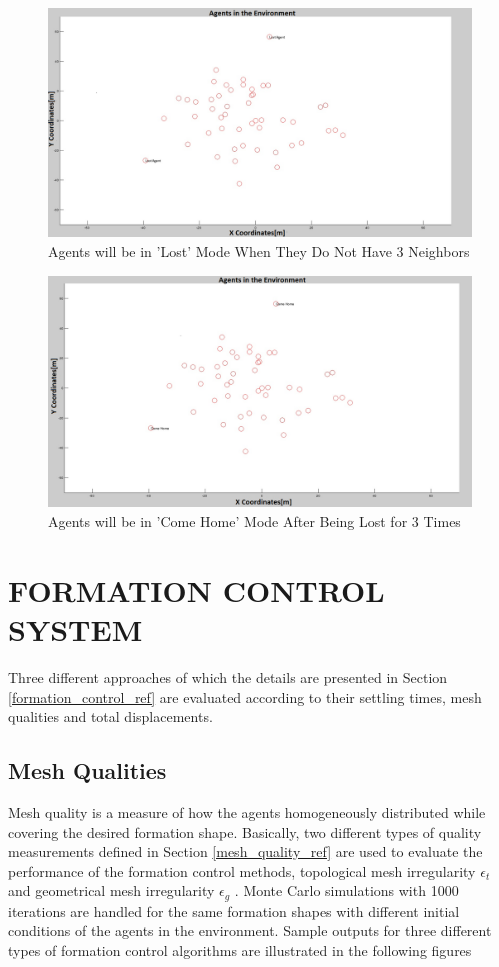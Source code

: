 \begin{figure}[H]
\caption{Agents will be in 'Lost' Mode When They Do Not Have 3 Neighbors} \label{lost_ref}
\centering
\centerline{\includegraphics[scale = 0.25]{Lost-2-2}}
\end{figure} 

\begin{figure}[H]
\captionsetup{format=hang,justification=centerfirst}
\caption{Agents will be in 'Come Home' Mode After Being Lost for 3 Times} \label{come_home_ref}
\centerline{\includegraphics[scale = 0.25]{Lost-2-3}}
\end{figure} 		
		
\section{FORMATION CONTROL SYSTEM}
Three different approaches of which the details are presented in Section \ref{formation_control_ref} are evaluated according to their settling times, mesh qualities and total displacements. 

\subsection{Mesh Qualities} 
Mesh quality is a measure of how the agents homogeneously distributed while covering the desired formation shape. Basically, two different types of quality measurements defined in Section \ref{mesh_quality_ref} are used to evaluate the performance of the formation control methods, topological mesh irregularity $\epsilon_t$ and geometrical mesh irregularity $\epsilon_g$ . Monte Carlo simulations with 1000 iterations are handled for the same formation shapes with different initial conditions of the agents in the environment. Sample outputs for three different types of formation control algorithms are illustrated in the following figures
  
